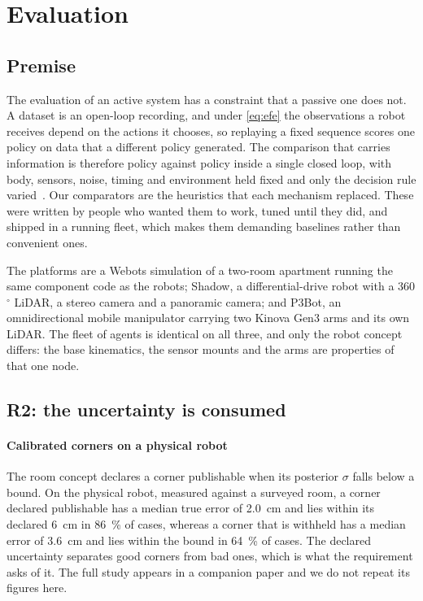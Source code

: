 \documentclass[10pt,twocolumn]{IEEEtran}
\begin{document}
\section{Evaluation}\label{sec:eval}

\subsection{Premise}

The evaluation of an active system has a constraint that a passive one does not. A dataset is an
open-loop recording, and under \eqref{eq:efe} the observations a robot receives depend on the actions
it chooses, so replaying a fixed sequence scores one policy on data that a different policy
generated. The comparison that carries information is therefore policy against policy inside a single
closed loop, with body, sensors, noise, timing and environment held fixed and only the decision rule
varied~\cite{placedSurveyActiveSimultaneous2023}. Our comparators are the heuristics that each
mechanism replaced. These were written by people who wanted them to work, tuned until they did, and
shipped in a running fleet, which makes them demanding baselines rather than convenient ones.

The platforms are a Webots simulation of a two-room apartment running the same component code as
the robots; Shadow, a differential-drive robot with a 360$^\circ$ LiDAR, a stereo camera and a
panoramic camera; and P3Bot, an omnidirectional mobile manipulator carrying two Kinova Gen3 arms and
its own LiDAR. The fleet of agents is identical on all three, and only the robot concept differs:
the base kinematics, the sensor mounts and the arms are properties of that one node.

\subsection{R2: the uncertainty is consumed}\label{sec:eval:r2}

\paragraph{Calibrated corners on a physical robot} The room concept declares a corner publishable
when its posterior $\sigma$ falls below a bound. On the physical robot, measured against a surveyed
room, a corner declared publishable has a median true error of \SI{2.0}{cm} and lies within its
declared \SI{6}{cm} in \SI{86}{\percent} of cases, whereas a corner that is withheld has a median
error of \SI{3.6}{cm} and lies within the bound in \SI{64}{\percent} of cases. The declared
uncertainty separates good corners from bad ones, which is what the requirement asks of it. The full
study appears in a companion paper and we do not repeat its figures here.
\end{document}
